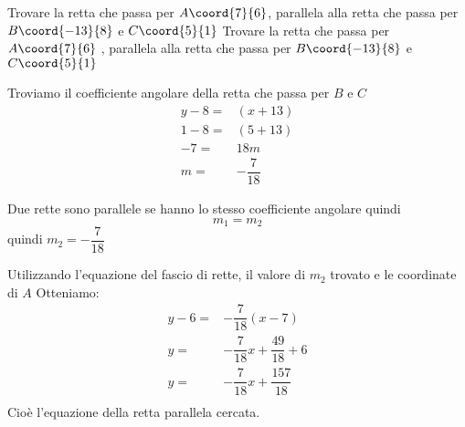 \begin{exercise}
	Trovare la retta che passa per $A\coord{7}{6}$, parallela alla retta che passa per $B\coord{-13}{8}$ e $C\coord{5}{1}$
	\tcblower
	Trovare la retta che passa per $A\coord{7}{6}$ , parallela alla retta che passa per $B\coord{-13}{8}$ e $C\coord{5}{1}$
	
	Troviamo il coefficiente angolare della retta che passa per $B$ e $C$
	\begin{align*}
		y-8=&(x+13)\\
		1-8=&(5+13)\\
		-7=&18m\\
		m=&-\dfrac{7}{18}
	\end{align*}
	
		Due rette sono parallele se hanno lo stesso coefficiente angolare quindi \[m_1=m_2 \]
		quindi $m_2=-\dfrac{7}{18}$ 
		
		Utilizzando l'equazione del fascio di rette, il valore di $m_2$ trovato e le coordinate di $A$ Otteniamo:
		\begin{align*}
			y-6=&-\dfrac{7}{18}(x-7)\\
			y=&-\dfrac{7}{18}x+\dfrac{49}{18}+6\\
			y=&-\dfrac{7}{18}x+\dfrac{157}{18}\\
		\end{align*}
		Cioè l'equazione della retta parallela cercata.	
			\begin{center}
				
			\end{center}
\end{exercise}	
